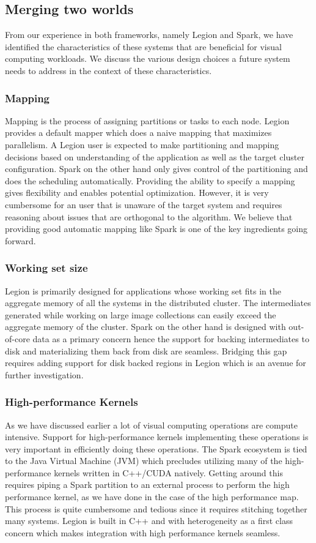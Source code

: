 \documentclass[tog]{acmsiggraph}
\begin{document}
\subsection{Merging two worlds}

From our experience in both frameworks, namely Legion and Spark, we have
identified the characteristics of these systems that are beneficial for visual
computing workloads. We discuss the various design choices a future system needs
to address in the context of these characteristics.

\subsubsection{Mapping}
Mapping is the process of assigning partitions or tasks to each node. Legion
provides a default mapper which does a naive mapping that maximizes parallelism.
A Legion user is expected to make partitioning and mapping decisions based on
understanding of the application as well as the target cluster configuration.
Spark on the other hand only gives control of the partitioning and does the
scheduling automatically. Providing the ability to specify a mapping gives
flexibility and enables potential optimization. However, it is very cumbersome
for an user that is unaware of the target system and requires reasoning about
issues that are orthogonal to the algorithm. We believe that providing good
automatic mapping like Spark is one of the key ingredients going forward.

\subsubsection{Working set size}
Legion is primarily designed for applications whose working set fits in the
aggregate memory of all the systems in the distributed cluster. The
intermediates generated while working on large image collections can easily
exceed the aggregate memory of the cluster. Spark on the other hand is designed
with out-of-core data as a primary concern hence the support for backing
intermediates to disk and materializing them back from disk are
seamless. Bridging this gap requires adding support for disk backed regions in
Legion which is an avenue for further investigation.

\subsubsection{High-performance Kernels}
As we have discussed earlier a lot of visual computing operations are compute
intensive. Support for high-performance kernels implementing these operations is
very important in efficiently doing these operations. The Spark ecosystem is
tied to the Java Virtual Machine (JVM) which precludes utilizing many of the
high-performance kernels written in C++/CUDA natively. Getting around this
requires piping a Spark partition to an external process to  perform the
high performance kernel, as we have done in the case of the high performance
map. This process is quite cumbersome and tedious since it requires stitching
together many systems. Legion is built in C++ and with heterogeneity as a first
class concern which makes integration with high performance kernels
seamless.
\end{document}
